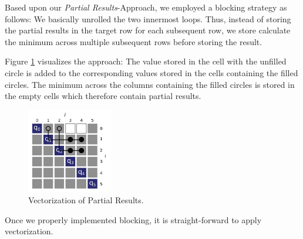  Based upon our \emph{Partial Results}-Approach, we employed a
blocking strategy as follows: We basically unrolled the two innermost loops.
Thus, instead of storing the partial results in the target row for each
subsequent row, we store calculate the minimum across multiple subsequent rows
before storing the result.

Figure \ref{fig:vec-blocking} visualizes the approach: The value stored in the
cell with the unfilled circle is added to the corresponding values stored in the
cells containing the filled circles. The minimum across the columns containing
the filled circles is stored in the empty cells which therefore contain partial
results.

\begin{figure}[htb]\centering
	\includegraphics[width=0.33\textwidth]{img/vectorized_blocking.png}
  \caption{Vectorization of Partial Results.\label{fig:vec-blocking}}
\end{figure}

 Once we properly implemented blocking, it is
straight-forward to apply vectorization.
